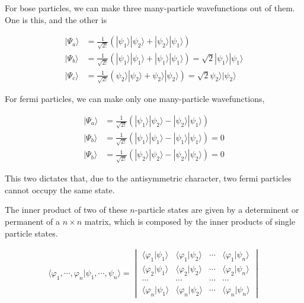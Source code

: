 For bose particles, we can make three many-particle wavefunctions out of them. One is this, and the other is

\[\begin{split}
|\Psi_a\rangle &= \frac{1}{\sqrt{2!}}(|\psi_1\rangle|\psi_2\rangle + |\psi_2\rangle|\psi_1\rangle)\\
|\Psi_b\rangle &= \frac{1}{\sqrt{2!}}(|\psi_1\rangle|\psi_1\rangle + |\psi_1\rangle|\psi_1\rangle) = \sqrt{2}|\psi_1\rangle|\psi_1\rangle\\
|\Psi_c\rangle &= \frac{1}{\sqrt{2!}}(\psi_2\rangle|\psi_2\rangle + \psi_2\rangle|\psi_2\rangle) = \sqrt{2}\psi_2\rangle|\psi_2\rangle
\end{split} \]

For fermi particles, we can make only one many-particle wavefunctions, 

\[\begin{split}
|\Psi_a\rangle &= \frac{1}{\sqrt{2!}}(|\psi_1\rangle|\psi_2\rangle - |\psi_2\rangle|\psi_1\rangle) \\
|\Psi_b\rangle &= \frac{1}{\sqrt{2!}}(|\psi_1\rangle|\psi_1\rangle - |\psi_1\rangle|\psi_1\rangle) = 0 \\
|\Psi_b\rangle &= \frac{1}{\sqrt{2!}}(|\psi_2\rangle|\psi_2\rangle - |\psi_2\rangle|\psi_2\rangle) = 0 
\end{split}\] 

This two dictates that, due to the antisymmetric character, two fermi particles cannot occupy the same state. 

The inner product of two of these $n$-particle states are given by a determinent or permanent of a $n\times n$ matrix, which is composed by the inner products of single particle states. 

\begin{align}
\langle\varphi_1,\cdots,\varphi_n|\psi_1,\cdots,\psi_n\rangle = \begin{vmatrix}
\langle \varphi_1|\psi_1\rangle & \langle \varphi_1|\psi_2\rangle & \cdots & \langle \varphi_1|\psi_n\rangle\\
\langle \varphi_2|\psi_1\rangle & \langle \varphi_2|\psi_2\rangle & \cdots & \langle \varphi_2|\psi_n\rangle\\
\cdots & \cdots & \cdots & \cdots\\
\langle \varphi_n|\psi_1\rangle & \langle \varphi_n|\psi_2\rangle & \cdots & \langle \varphi_n|\psi_n\rangle
\end{vmatrix}
\end{align}

